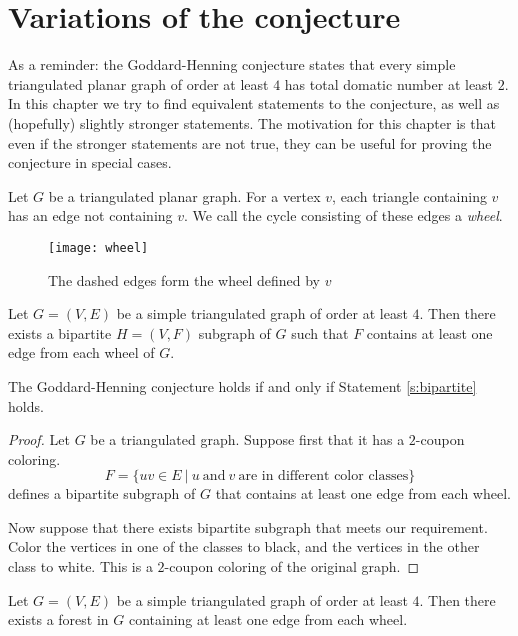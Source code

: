 \section{Variations of the conjecture}

As a reminder: the Goddard-Henning conjecture states that every simple triangulated
planar graph of order at least $4$ has total domatic number at least $2$. In this
chapter we try to find equivalent statements to the
conjecture, as well as (hopefully) slightly stronger statements. The motivation for
this chapter is that even if the stronger
statements are not true, they can be useful for proving the conjecture in special cases.

\begin{definition}
  Let $G$ be a triangulated planar graph. For a vertex $v$, each triangle
  containing $v$ has an edge not containing $v$. We call the cycle consisting of
  these edges a \emph{wheel}.
\end{definition}

\begin{figure}[ht]
  \centering
  \texttt{[image: wheel]}
  \caption{The dashed edges form the wheel defined by $v$ }
  \label{fig:wheel}
\end{figure}

\begin{guess}\label{s:bipartite}
  Let $G = (V, E)$ be a simple triangulated graph of order at least $4$. Then there
  exists a bipartite $H = (V, F)$ subgraph of $G$ such that $F$ contains at
  least one edge from each wheel of $G$.
\end{guess}

\begin{claim}
  The Goddard-Henning conjecture holds if and only if Statement \ref{s:bipartite} holds.
\end{claim}
\begin{proof}
  Let $G$ be a triangulated graph. Suppose first that it has a $2$-coupon coloring.
  $$F = \{uv \in E\ |\ u\ \textrm{and}\ v\ \textrm{are in different color classes}\}$$
  defines a bipartite subgraph of $G$ that contains at least one edge from each wheel.

  Now suppose that there exists bipartite subgraph that meets our requirement. Color
  the vertices in one of the classes to black, and the vertices in the other class
  to white. This is a $2$-coupon coloring of the original graph.
\end{proof}

\begin{guess}\label{s:forest}
  Let $G = (V, E)$ be a simple triangulated graph of order at least $4$. Then there
  exists a forest in $G$ containing at least one edge from each wheel.
\end{guess}

